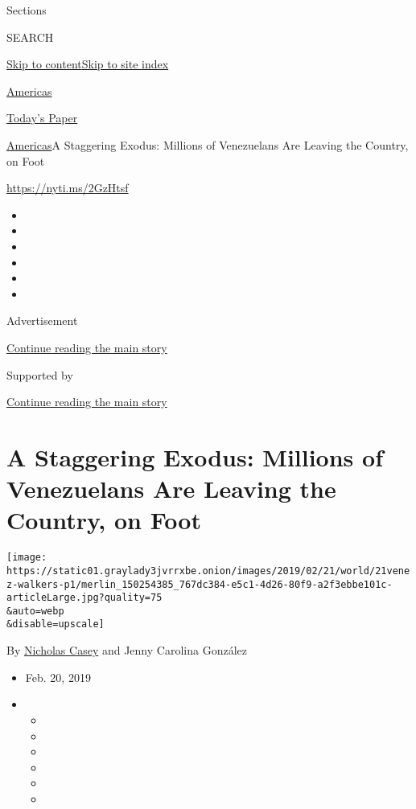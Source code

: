 Sections

SEARCH

\protect\hyperlink{site-content}{Skip to
content}\protect\hyperlink{site-index}{Skip to site index}

\href{https://www.nytimes3xbfgragh.onion/section/world/americas}{Americas}

\href{https://myaccount.nytimes3xbfgragh.onion/auth/login?response_type=cookie\&client_id=vi}{}

\href{https://www.nytimes3xbfgragh.onion/section/todayspaper}{Today's
Paper}

\href{/section/world/americas}{Americas}\textbar{}A Staggering Exodus:
Millions of Venezuelans Are Leaving the Country, on Foot

\url{https://nyti.ms/2GzHtsf}

\begin{itemize}
\item
\item
\item
\item
\item
\item
\end{itemize}

Advertisement

\protect\hyperlink{after-top}{Continue reading the main story}

Supported by

\protect\hyperlink{after-sponsor}{Continue reading the main story}

\hypertarget{a-staggering-exodus-millions-of-venezuelans-are-leaving-the-country-on-foot}{%
\section{A Staggering Exodus: Millions of Venezuelans Are Leaving the
Country, on
Foot}\label{a-staggering-exodus-millions-of-venezuelans-are-leaving-the-country-on-foot}}

\texttt{[image: https://static01.graylady3jvrrxbe.onion/images/2019/02/21/world/21venez-walkers-p1/merlin\_150254385\_767dc384-e5c1-4d26-80f9-a2f3ebbe101c-articleLarge.jpg?quality=75\\\&auto=webp\\\&disable=upscale]}

By \href{https://www.nytimes3xbfgragh.onion/by/nicholas-casey}{Nicholas
Casey} and Jenny Carolina González

\begin{itemize}
\item
  Feb. 20, 2019
\item
  \begin{itemize}
  \item
  \item
  \item
  \item
  \item
  \item
  \end{itemize}
\end{itemize}

